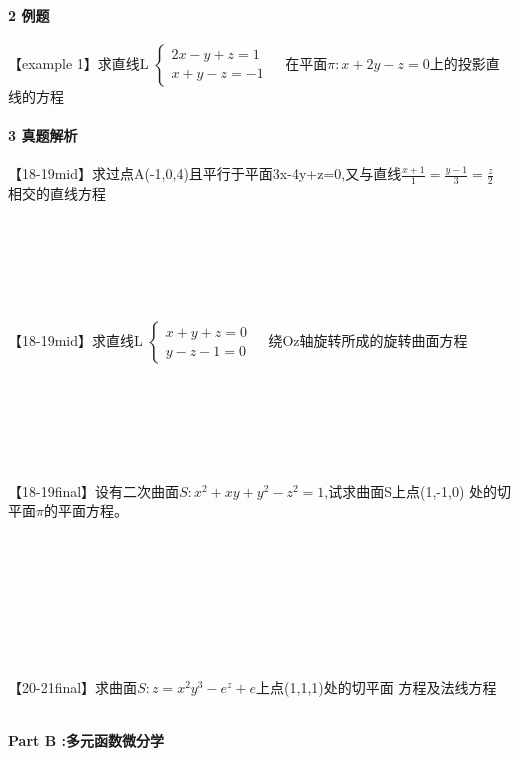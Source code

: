 \documentclass[12pt]{scrartcl}
\begin{document}
{\paragraph*{\large 2 例题}\leavevmode \newline
【example 1】求直线L
$\left\{
\begin{array}{lr}
2x-y+z=1 &  \\
x+y-z=-1 &  
\end{array}
\right.$
在平面$\pi:x+2y-z=0$上的投影直线的方程    \leavevmode \newline

\newpage
\paragraph*{\large 3 真题解析}\leavevmode \newline
【18-19mid】求过点A(-1,0,4)且平行于平面3x-4y+z=0,又与直线$\frac{x+1}{1}=\frac{y-1}{3}=\frac{z}{2}   $
相交的直线方程 \leavevmode \newline
\\
\\
\\
\\
\\
\\
\\
【18-19mid】求直线L
            $\left\{
            \begin{array}{lr}
            x+y+z=0 &  \\
            y-z-1=0 &  
            \end{array}
            \right.$
绕Oz轴旋转所成的旋转曲面方程    \leavevmode \newline
\\
\\
\\
\\
\\
\\
\\
【18-19final】设有二次曲面$S:x^2+xy+y^2-z^2=1$,试求曲面S上点(1,-1,0)
处的切平面$\pi$的平面方程。\leavevmode \newline
\\
\\
\\
\\
\\
\\
\\
\\
\\
【20-21final】求曲面$S:z=x^2y^3-e^z+e$上点(1,1,1)处的切平面
方程及法线方程
\leavevmode \newline  
\\
\\
\newpage
\begin{center}
    \textbf{\large{Part B :多元函数微分学} }
    \end{center} 
}
\end{document}
